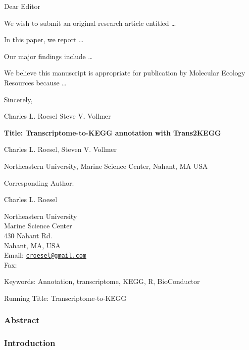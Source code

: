 \documentclass[12pt,portrait]{article}
\begin{document}
Dear Editor

We wish to submit an original research article entitled \ldots{}

In this paper, we report \ldots{}

Our major findings include \ldots{}

We believe this manuscript is appropriate for publication by Molecular
Ecology Resources because \ldots{}

Sincerely,

Charles L. Roesel \newline Steve V. Vollmer \newline

\linenumbers
\clearpage

\textbf{Title: Transcriptome-to-KEGG annotation with Trans2KEGG}
\newline

Charles L. Roesel, Steven V. Vollmer \newline

Northeastern University, Marine Science Center, Nahant, MA USA \newline
\newline

Corresponding Author:

Charles L. Roesel

Northeastern University\\
Marine Science Center\\
430 Nahant Rd.\\
Nahant, MA, USA\\
Email: \href{mailto:croesel@gmail.com}{\nolinkurl{croesel@gmail.com}}\\
Fax: \newline

Keywords: Annotation, transcriptome, KEGG, R, BioConductor

Running Title: Transcriptome-to-KEGG

\clearpage

\doublespacing

\setlength{\parindent}{0.2in}

\newpage

\hypertarget{abstract}{%
\subsubsection{Abstract}\label{abstract}}

\hypertarget{introduction}{%
\subsubsection{Introduction}\label{introduction}}
\end{document}
